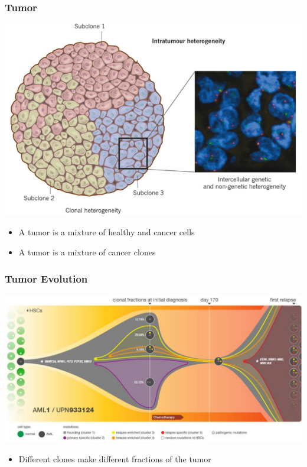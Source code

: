 \begin{frame}
\frametitle{Tumor}

\centering
  \includegraphics[width=0.8\linewidth]{figures/tumor-heterogeneous}
  \begin{itemize}
    \item 
      A \alert{tumor} is a mixture of healthy and cancer cells
    \item 
      A \alert{tumor} is a mixture of cancer clones
\end{itemize}
\end{frame}


\begin{frame}
\frametitle{Tumor Evolution}

\centering
  \includegraphics[width=\linewidth]{figures/clonal}
\begin{itemize}
\item Different clones make different fractions of the tumor 
\end{itemize}
\end{frame}


\def\mut#1#2{%
\begin{scope}[shift={#1}]
\node[thick,draw,fill=blue!70,circle, scale=3.5] (#2) {};
\end{scope}
}

